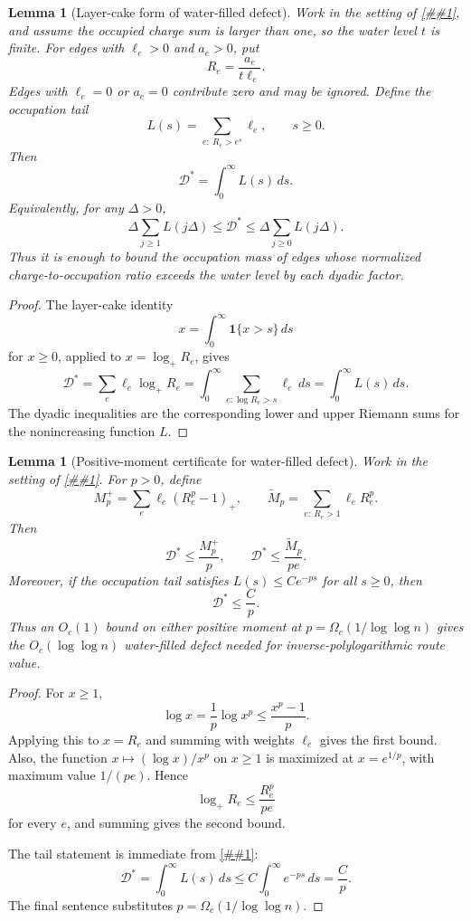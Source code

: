 \documentclass[10pt]{article}
\newcommand{\cref}[1]{\ref{##1}}
\newtheorem{lemma}[theorem]{Lemma}
\theoremstyle{definition}
\begin{document}
\begin{lemma}[Layer-cake form of water-filled defect]
   \label{lem:waterfilled-layercake}
   Work in the setting of \cref{lem:waterfilled-allocation}, and assume the
   occupied charge sum is larger than one, so the water level \(t\) is finite.
   For edges with \(\ell_e>0\) and \(a_e>0\), put
   \[
      R_e=\frac{a_e}{t\ell_e}.
   \]
   Edges with \(\ell_e=0\) or \(a_e=0\) contribute zero and may be ignored.
   Define the occupation tail
   \[
      L(s)=\sum_{e:\ R_e>e^s}\ell_e,\qquad s\ge0 .
   \]
   Then
   \[
      \mathcal D^*=\int_0^\infty L(s)\,ds .
   \]
   Equivalently, for any \(\Delta>0\),
   \[
      \Delta\sum_{j\ge1}L(j\Delta)
      \le
      \mathcal D^*
      \le
      \Delta\sum_{j\ge0}L(j\Delta).
   \]
   Thus it is enough to bound the occupation mass of edges whose normalized
   charge-to-occupation ratio exceeds the water level by each dyadic factor.
\end{lemma}

\begin{proof}
   The layer-cake identity
   \[
      x=\int_0^\infty \mathbf 1\{x>s\}\,ds
   \]
   for \(x\ge0\), applied to \(x=\log_+R_e\), gives
   \[
      \mathcal D^*
      =
      \sum_e\ell_e\log_+R_e
      =
      \int_0^\infty
      \sum_{e:\log R_e>s}\ell_e\,ds
      =
      \int_0^\infty L(s)\,ds .
   \]
   The dyadic inequalities are the corresponding lower and upper Riemann sums
   for the nonincreasing function \(L\).
\end{proof}

\begin{lemma}[Positive-moment certificate for water-filled defect]
   \label{lem:waterfilled-moment-certificate}
   Work in the setting of \cref{lem:waterfilled-layercake}.  For \(p>0\),
   define
   \[
      M_p^+=\sum_e\ell_e(R_e^p-1)_+,
      \qquad
      \widetilde M_p=\sum_{e:\ R_e>1}\ell_eR_e^p .
   \]
   Then
   \[
      \mathcal D^*
      \le \frac{M_p^+}{p},
      \qquad
      \mathcal D^*
      \le \frac{\widetilde M_p}{pe}.
   \]
   Moreover, if the occupation tail satisfies \(L(s)\le C e^{-ps}\) for all
   \(s\ge0\), then
   \[
      \mathcal D^*\le \frac Cp .
   \]
   Thus an \(O_c(1)\) bound on either positive moment at
   \(p=\Omega_c(1/\log\log n)\) gives the
   \(O_c(\log\log n)\) water-filled defect needed for inverse-polylogarithmic
   route value.
\end{lemma}

\begin{proof}
   For \(x\ge1\),
   \[
      \log x=\frac1p\log x^p\le \frac{x^p-1}{p}.
   \]
   Applying this to \(x=R_e\) and summing with weights \(\ell_e\) gives the
   first bound.  Also, the function \(x\mapsto(\log x)/x^p\) on \(x\ge1\) is
   maximized at \(x=e^{1/p}\), with maximum value \(1/(pe)\).  Hence
   \[
      \log_+R_e\le \frac{R_e^p}{pe}
   \]
   for every \(e\), and summing gives the second bound.

   The tail statement is immediate from \cref{lem:waterfilled-layercake}:
   \[
      \mathcal D^*=\int_0^\infty L(s)\,ds
      \le
      C\int_0^\infty e^{-ps}\,ds
      =
      \frac Cp .
   \]
   The final sentence substitutes \(p=\Omega_c(1/\log\log n)\).
\end{proof}
\end{document}
